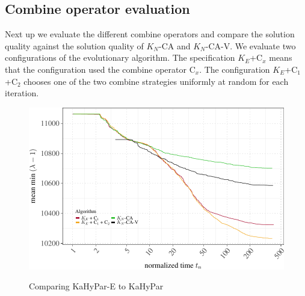\documentclass[a4paper,12pt,titlepage, BCOR7mm,headsepline]{scrbook}
\numberwithin{equation}{section}
\begin{document}
\subsection{Combine operator evaluation}
\label{sec:combineoperatorevaluation}
Next up we evaluate the different combine operators and compare the solution quality against the solution quality of $K_N$-CA and $K_N$-CA-V. We evaluate two configurations of the evolutionary algorithm. The specification $K_E$+C$_x$ means that the configuration used the combine operator C$_x$. The configuration $K_E$+C$_1$+C$_2$ chooses one of the two combine strategies uniformly at random for each iteration.
\begin{figure}[H]
\caption{Comparing KaHyPar-E to KaHyPar}
\begin{center}
\includegraphics{rnw/tuning_subset_plots/combine_plot-1}\label{fig:combineop}
\end{center} 

\end{figure}
\end{document}
